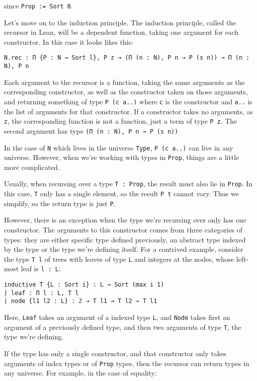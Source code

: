 \documentclass[a4paper, 12pt]{article}
\newcommand{\lean}[1]{\texttt{#1}}
\theoremstyle{changedot}
\theoremstyle{changedotbreak}
\theoremstyle{nonumberplain}
\begin{document}
since \lean{Prop := Sort 0}.

Let's move on to the induction principle. The induction principle, called the recursor in Lean, will be a dependent function, taking one argument for each constructor. In this case it looks likes this:
\begin{verbatim}
N.rec : Π {P : N → Sort l}, P z → (Π (n : N), P n → P (s n)) → Π (n : N), P n
\end{verbatim}
Each argument to the recursor is a function, taking the same arguments as the corresponding constructor, as well as the constructor taken on those arguments, and returning something of type \lean{P (c a..)} where \lean{c} is the constructor and \lean{a..} is the list of arguments for that constructor. If a constructor takes no arguments, as \lean{z}, the corresponding function is not a function, just a term of type \lean{P z}. The second argument has type \lean{(Π (n : N), P n → P (s n))}

In the case of \lean{N} which lives in the universe \lean{Type}, \lean{P (c a..)} can live in any universe. However, when we're working with types in \lean{Prop}, things are a little more complicated.

Usually, when recursing over a type \lean{T : Prop}, the result must also lie in \lean{Prop}. In this case, \lean{T} only has a single element, so the result \lean{P t} cannot vary. Thus we simplify, so the return type is just \lean{P}.

However, there is an exception when the type we're recursing over only has one constructor. The arguments to this constructor comes from three categories of types: they are either specific type defined previously, an abstract type indexed by the type or the type we're defining itself. For a contrived example, consider the type \lean{T l} of trees with leaves of type \lean{L} and integers at the nodes, whose left-most leaf is \lean{l : L}:
\begin{verbatim}
inductive T {L : Sort i} : L → Sort (max i 1)
| leaf : Π l : L, T l
| node {l1 l2 : L} : ℤ → T l1 → T l2 → T l1
\end{verbatim}
Here, \lean{Leaf} takes an argument of a indexed type \lean{L}, and \lean{Node} takes first an argument of a previously defined type, and then two arguments of type \lean{T}, the type we're defining.

If the type has only a single constructor, and that constructor only takes arguments of index types or of \lean{Prop} types, then the recursor can return types in any universe. For example, in the case of equality:
\end{document}
